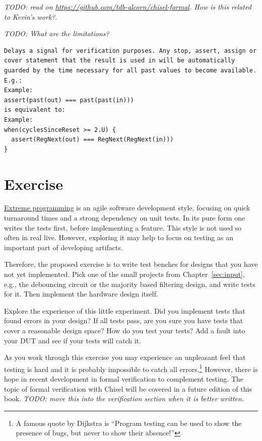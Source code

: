 \documentclass[%
    10pt,
    headinclude, footexclude,
    openright, %
    notitlepage,
    cleardoubleempty,
    headsepline,
    pointlessnumbers,
    bibtotoc, idxtotoc,
    ]{scrbook}
\newcommand{\todo}[1]{{\emph{TODO: #1}}}
\begin{document}
\todo{read on \url{https://github.com/tdb-alcorn/chisel-formal}.
How is this related to Kevin's work?}.

\todo{What are the limitations?}

\begin{verbatim}
Delays a signal for verification purposes. Any stop, assert, assign or cover statement that the result is used in will be automatically guarded by the time necessary for all past values to become available. E.g.:
Example:
assert(past(out) === past(past(in)))
is equivalent to:
Example:
when(cyclesSinceReset >= 2.U) {
  assert(RegNext(out) === RegNext(RegNext(in)))
}
\end{verbatim}




\section{Exercise}

\href{https://en.wikipedia.org/wiki/Extreme_programming}{Extreme programming} is an agile
software development style, focusing on quick turnaround times and a strong dependency on unit
tests. In its pure form one writes the tests first, before implementing a feature. This style is not used
so often in real live. However, exploring it may help to focus on testing as an important part of
developing artifacts.

Therefore, the proposed exercise is to write test benches for designs that you have not yet implemented.
Pick one of the small projects from Chapter~\ref{sec:input}, e.g., the debouncing circuit or
the majority based filtering design, and write tests for it. Then implement the hardware design
itself.

Explore the experience of this little experiment. Did you implement tests that found errors in your design?
If all tests pass, are you sure you have tests that cover a reasonable design space? How do you test
your tests? Add a fault into your DUT and see if your tests will catch it.

As you work through this exercise you may experience an unpleasant feel that testing is hard and
it is probably impossible to catch all errors.\footnote{A famous quote by Dijkstra is ``Program testing can
be used to show the presence of bugs, but never to show their absence!''}
However, there is hope in recent development in formal verification to complement testing.
The topic of formal verification with Chisel will be covered in a future edition of this book.
\todo{move this into the verification section when it is better written.}
\end{document}
